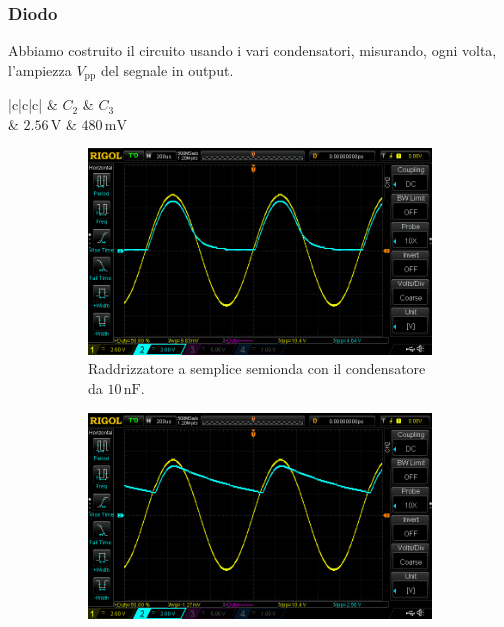 \documentclass[a4paper]{article}
\begin{document}
			\subsubsection{Diodo}
				Abbiamo costruito il circuito usando i vari condensatori, misurando, ogni volta, l'ampiezza $ V_{\mathrm{pp}} $ del segnale in output.
				\begin{center}
					\begin{tabular}{ |c|c|c| }
						\hline
						 & \textbf{$ C_{2} $} & \textbf{$ C_{3} $} \\
						\hline
						 & $ 2.56 \, \mathrm{V} $ & $ 480 \, \mathrm{mV} $ \\
						\hline
					\end{tabular}
				\end{center}
				\begin{figure}[h!]
					\centering
					\begin{subfigure}{0.4\textwidth}
						\centering
						\includegraphics[scale=0.2]{raddrizzatoreASempliceSemiondaDiodo10n}
						\caption{Raddrizzatore a semplice semionda con il condensatore da $ 10 \, \mathrm{nF} $.}
					\end{subfigure}
					\begin{subfigure}{0.4\textwidth}
						\centering
						\includegraphics[scale=0.2]{raddrizzatoreASempliceSemiondaDiodo100n}

\end{subfigure}
\end{figure}
\end{document}
